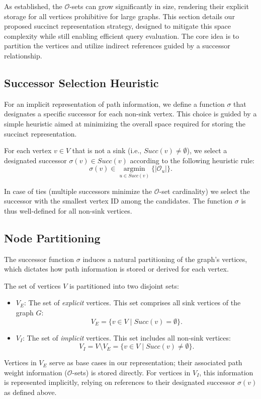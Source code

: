 As established, the $\mathcal{O}$-sets can grow significantly in size, rendering their explicit storage for all vertices prohibitive for large graphs. This section details our proposed succinct representation strategy, designed to mitigate this space complexity while still enabling efficient query evaluation. The core idea is to partition the vertices and utilize indirect references guided by a successor relationship.

\subsection*{Successor Selection Heuristic}
\label{subsec:successor_selection}

For an implicit representation of path information, we define a function $\sigma$ that designates a specific successor for each non-sink vertex. This choice is guided by a simple heuristic aimed at minimizing the overall space required for storing the succinct representation.

\begin{definition}
    \label{def:sigma_function}
    For each vertex $v \in V$ that is not a sink (i.e., $Succ(v) \neq \emptyset$), we select a designated successor $\sigma(v) \in Succ(v)$ according to the following heuristic rule:
    \[ \sigma(v) \in \underset{u \in Succ(v)}{\operatorname{argmin}} \{ |\mathcal{O}_u| \}. \]
\end{definition}
In case of ties (multiple successors minimize the $\mathcal{O}$-set cardinality) we select the successor with the smallest vertex ID among the candidates. The function $\sigma$ is thus well-defined for all non-sink vertices.

\subsection*{Node Partitioning}
\label{subsec:node_partitioning}

The successor function $\sigma$ induces a natural partitioning of the graph's vertices, which dictates how path information is stored or derived for each vertex.

\begin{definition}
    \label{def:explicit_implicit}
    The set of vertices $V$ is partitioned into two disjoint sets:
    \begin{itemize}
        \item $V_E$: The set of \emph{explicit} vertices. This set comprises all sink vertices of the graph $G$:
              \[ V_E = \{ v \in V \mid Succ(v) = \emptyset \}. \]
        \item $V_I$: The set of \emph{implicit} vertices. This set includes all non-sink vertices:
              \[ V_I = V \setminus V_E = \{ v \in V \mid Succ(v) \neq \emptyset \}. \]
    \end{itemize}
\end{definition}
Vertices in $V_E$ serve as base cases in our representation; their associated path weight information ($\mathcal{O}$-sets) is stored directly. For vertices in $V_I$, this information is represented implicitly, relying on references to their designated successor $\sigma(v)$ as defined above.

